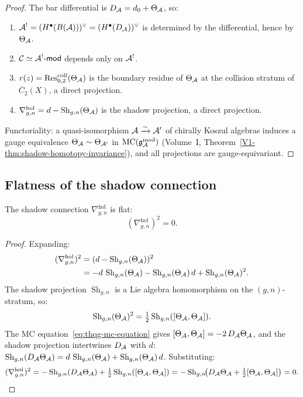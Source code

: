 \begin{proof}
The bar differential is $D_{\mathcal{A}} = d_0 + \Theta_{\mathcal{A}}$, so:
\begin{enumerate}[label=(\roman*)]
\item $\mathcal{A}^! = (H^\bullet(B(\mathcal{A})))^\vee = (H^\bullet(D_{\mathcal{A}}))^\vee$
 is determined by the differential, hence by $\Theta_{\mathcal{A}}$.
\item $\mathcal{C} \simeq \mathcal{A}^!\text{-}\mathsf{mod}$ depends only
 on $\mathcal{A}^!$.
\item $r(z) = \operatorname{Res}^{\mathrm{coll}}_{0,2}(\Theta_{\mathcal{A}})$ is
 the boundary residue of $\Theta_{\mathcal{A}}$ at the collision
 stratum of $\overline{C}_2(X)$, a direct projection.
\item $\nabla^{\mathrm{hol}}_{g,n} = d - \operatorname{Sh}_{g,n}(\Theta_{\mathcal{A}})$
 is the shadow projection, a direct projection.
\end{enumerate}
Functoriality: a quasi-isomorphism $\mathcal{A} \xrightarrow{\sim} \mathcal{A}'$ of
chirally Koszul algebras induces a gauge equivalence
$\Theta_{\mathcal{A}} \sim \Theta_{\mathcal{A}'}$ in $\mathrm{MC}(\mathfrak{g}_{\mathcal{A}}^{\mathrm{mod}})$
(Volume~I, Theorem~\ref{V1-thm:shadow-homotopy-invariance}),
and all projections are gauge-equivariant.
\end{proof}


\subsection{Flatness of the shadow connection}

\begin{theorem}
The shadow connection $\nabla^{\mathrm{hol}}_{g,n}$ is flat:
\begin{equation}%
(\nabla^{\mathrm{hol}}_{g,n})^2 = 0.
\end{equation}
\end{theorem}

\begin{proof}
Expanding:
\begin{align}
(\nabla^{\mathrm{hol}}_{g,n})^2
&= (d - \operatorname{Sh}_{g,n}(\Theta_{\mathcal{A}}))^2 \notag \\
&= - d\,\operatorname{Sh}_{g,n}(\Theta_{\mathcal{A}})
 - \operatorname{Sh}_{g,n}(\Theta_{\mathcal{A}})\,d
 + \operatorname{Sh}_{g,n}(\Theta_{\mathcal{A}})^2.
\end{align}
The shadow projection $\operatorname{Sh}_{g,n}$ is a Lie algebra
homomorphism on the $(g,n)$-stratum, so:
\[
\operatorname{Sh}_{g,n}(\Theta_{\mathcal{A}})^2
= \tfrac{1}{2}\operatorname{Sh}_{g,n}([\Theta_{\mathcal{A}}, \Theta_{\mathcal{A}}]).
\]
The MC equation~\eqref{eq:thqg-mc-equation} gives
$[\Theta_{\mathcal{A}}, \Theta_{\mathcal{A}}] = -2\,D_{\mathcal{A}}\Theta_{\mathcal{A}}$, and the shadow
projection intertwines $D_{\mathcal{A}}$ with $d$:
$\operatorname{Sh}_{g,n}(D_{\mathcal{A}}\Theta_{\mathcal{A}})
= d\,\operatorname{Sh}_{g,n}(\Theta_{\mathcal{A}})
+ \operatorname{Sh}_{g,n}(\Theta_{\mathcal{A}})\,d$.
Substituting:
\[
(\nabla^{\mathrm{hol}}_{g,n})^2
= - \operatorname{Sh}_{g,n}(D_{\mathcal{A}}\Theta_{\mathcal{A}})
 + \tfrac{1}{2}\operatorname{Sh}_{g,n}([\Theta_{\mathcal{A}}, \Theta_{\mathcal{A}}])
= - \operatorname{Sh}_{g,n}\!\bigl(D_{\mathcal{A}}\Theta_{\mathcal{A}}
 + \tfrac{1}{2}[\Theta_{\mathcal{A}}, \Theta_{\mathcal{A}}]\bigr)
= 0.\qedhere
\]
\end{proof}

